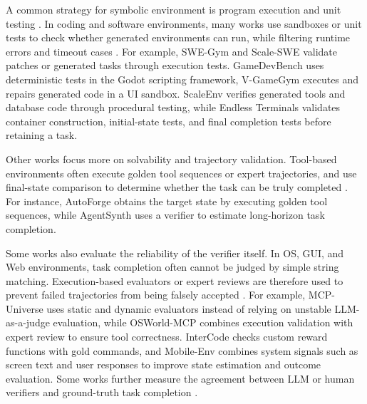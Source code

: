 A common strategy for symbolic environment is program execution and unit testing \cite{SWE-Hub}. In coding and software environments, many works use sandboxes or unit tests to check whether generated environments can run, while filtering runtime errors and timeout cases \cite{SWE-Universe, SWE-Hub, MCP-Universe}. For example, SWE-Gym \cite{SWE-Gym} and Scale-SWE \cite{Scale-SWE} validate patches or generated tasks through execution tests. GameDevBench \cite{GameDevBench} uses deterministic tests in the Godot scripting framework, V-GameGym \cite{V-GameGym} executes and repairs generated code in a UI sandbox. ScaleEnv \cite{ScaleEnv} verifies generated tools and database code through procedural testing, while Endless Terminals \cite{Endless_Terminals} validates container construction, initial-state tests, and final completion tests before retaining a task.

Other works focus more on solvability and trajectory validation. Tool-based environments often execute golden tool sequences or expert trajectories, and use final-state comparison to determine whether the task can be truly completed \cite{Agent2World, SciAgentGym, AgentGen}. For instance, AutoForge \cite{AutoForge} obtains the target state by executing golden tool sequences, while AgentSynth \cite{AgentSynth} uses a verifier to estimate long-horizon task completion.

Some works also evaluate the reliability of the verifier itself. In OS, GUI, and Web environments, task completion often cannot be judged by simple string matching. Execution-based evaluators or expert reviews are therefore used to prevent failed trajectories from being falsely accepted \cite{OSWorld-MCP, EnvScaler, AutoWebWorld}. For example, MCP-Universe \cite{MCP-Universe} uses static and dynamic evaluators instead of relying on unstable LLM-as-a-judge evaluation, while OSWorld-MCP \cite{OSWorld-MCP} combines execution validation with expert review to ensure tool correctness. InterCode \cite{InterCode} checks custom reward functions with gold commands, and Mobile-Env \cite{Mobile-Env} combines system signals such as screen text and user responses to improve state estimation and outcome evaluation. Some works further measure the agreement between LLM or human verifiers and ground-truth task completion \cite{AgentSynth, Terminal-Bench, SciAgentGym}.


